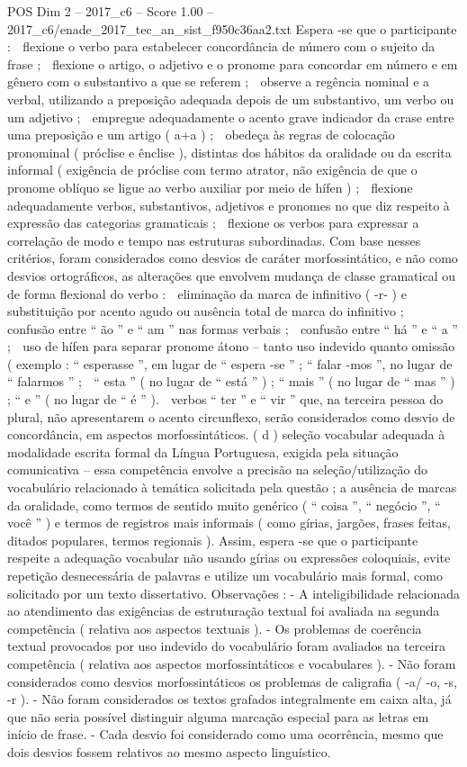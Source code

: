 \begin{textsample}{POS Dim 2 – 2017\_c6 – Score 1.00 – 2017\_c6/enade\_2017\_tec\_an\_sist\_f950c36aa2.txt}
Espera -se que o participante :  flexione o verbo para estabelecer concordância de número com o sujeito da frase ;  flexione o artigo, o adjetivo e o pronome para concordar em número e em gênero com o substantivo a que se referem ;  observe a regência nominal e a verbal, utilizando a preposição adequada depois de um substantivo, um verbo ou um adjetivo ;  empregue adequadamente o acento grave indicador da crase entre uma preposição e um artigo ( a+a ) ;  obedeça às regras de colocação pronominal ( próclise e ênclise ), distintas dos hábitos da oralidade ou da escrita informal ( exigência de próclise com termo atrator, não exigência de que o pronome oblíquo se ligue ao verbo auxiliar por meio de hífen ) ;  flexione adequadamente verbos, substantivos, adjetivos e pronomes no que diz respeito à expressão das categorias gramaticais ;  flexione os verbos para expressar a correlação de modo e tempo nas estruturas subordinadas.
Com base nesses critérios, foram considerados como desvios de caráter morfossintático, e não como desvios ortográficos, as alterações que envolvem mudança de classe gramatical ou de forma flexional do verbo :  eliminação da marca de infinitivo ( -r- ) e substituição por acento agudo ou ausência total de marca do infinitivo ;  confusão entre “ ão ” e “ am ” nas formas verbais ;  confusão entre “ há ” e “ a ” ;  uso de hífen para separar pronome átono – tanto uso indevido quanto omissão ( exemplo : “ esperasse ”, em lugar de “ espera -se ” ; “ falar -mos ”, no lugar de “ falarmos ” ;  “ esta ” ( no lugar de “ está ” ) ; “ mais ” ( no lugar de “ mas ” ) ; “ e ” ( no lugar de “ é ” ).  verbos “ ter ” e “ vir ” que, na terceira pessoa do plural, não apresentarem o acento circunflexo, serão considerados como desvio de concordância, em aspectos morfossintáticos. ( d ) seleção vocabular adequada à modalidade escrita formal da Língua Portuguesa, exigida pela situação comunicativa – essa competência envolve a precisão na seleção/utilização do vocabulário relacionado à temática solicitada pela questão ; a ausência de marcas da oralidade, como termos de sentido muito genérico ( “ coisa ”, “ negócio ”, “ você ” ) e termos de registros mais informais ( como gírias, jargões, frases feitas, ditados populares, termos regionais ).
Assim, espera -se que o participante respeite a adequação vocabular não usando gírias ou expressões coloquiais, evite repetição desnecessária de palavras e utilize um vocabulário mais formal, como solicitado por um texto dissertativo.
Observações : - A inteligibilidade relacionada ao atendimento das exigências de estruturação textual foi avaliada na segunda competência ( relativa aos aspectos textuais ). - Os problemas de coerência textual provocados por uso indevido do vocabulário foram avaliados na terceira competência ( relativa aos aspectos morfossintáticos e vocabulares ). - Não foram considerados como desvios morfossintáticos os problemas de caligrafia ( -a/ -o, -s, -r ). - Não foram considerados os textos grafados integralmente em caixa alta, já que não seria possível distinguir alguma marcação especial para as letras em início de frase. - Cada desvio foi considerado como uma ocorrência, mesmo que dois desvios fossem relativos ao mesmo aspecto linguístico.

\end{textsample}
